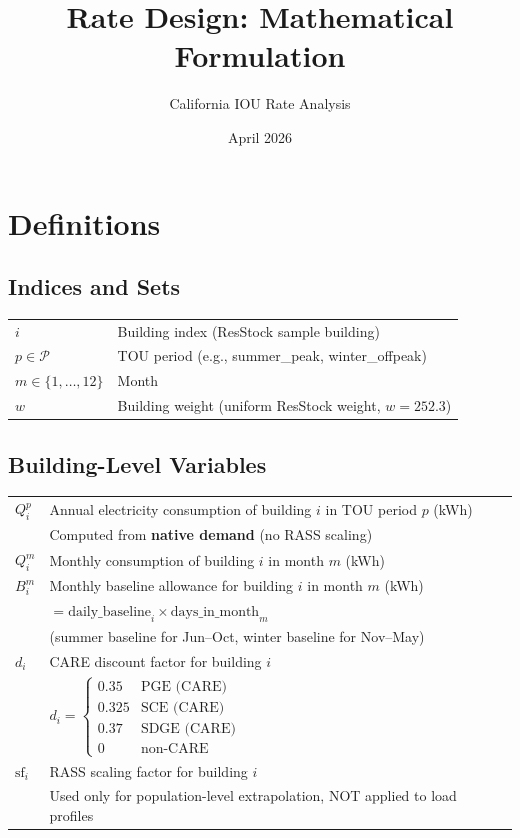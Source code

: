 \documentclass[11pt]{article}
\title{Rate Design: Mathematical Formulation}
\author{California IOU Rate Analysis}
\date{April 2026}
\begin{document}
\maketitle

\section{Definitions}

\subsection{Indices and Sets}

\begin{tabular}{ll}
$i$ & Building index (ResStock sample building) \\
$p \in \mathcal{P}$ & TOU period (e.g., summer\_peak, winter\_offpeak) \\
$m \in \{1, \ldots, 12\}$ & Month \\
$w$ & Building weight (uniform ResStock weight, $w = 252.3$) \\
\end{tabular}

\subsection{Building-Level Variables}

\begin{tabular}{ll}
$Q_i^p$ & Annual electricity consumption of building $i$ in TOU period $p$ (kWh) \\
         & Computed from \textbf{native demand} (no RASS scaling) \\
$Q_i^m$ & Monthly consumption of building $i$ in month $m$ (kWh) \\
$B_i^m$ & Monthly baseline allowance for building $i$ in month $m$ (kWh) \\
         & $= \text{daily\_baseline}_i \times \text{days\_in\_month}_m$ \\
         & (summer baseline for Jun--Oct, winter baseline for Nov--May) \\
$d_i$ & CARE discount factor for building $i$ \\
         & $d_i = \begin{cases} 0.35 & \text{PGE (CARE)} \\ 0.325 & \text{SCE (CARE)} \\ 0.37 & \text{SDGE (CARE)} \\ 0 & \text{non-CARE} \end{cases}$ \\
$\text{sf}_i$ & RASS scaling factor for building $i$ \\
         & Used only for population-level extrapolation, NOT applied to load profiles \\
\end{tabular}
\end{document}
